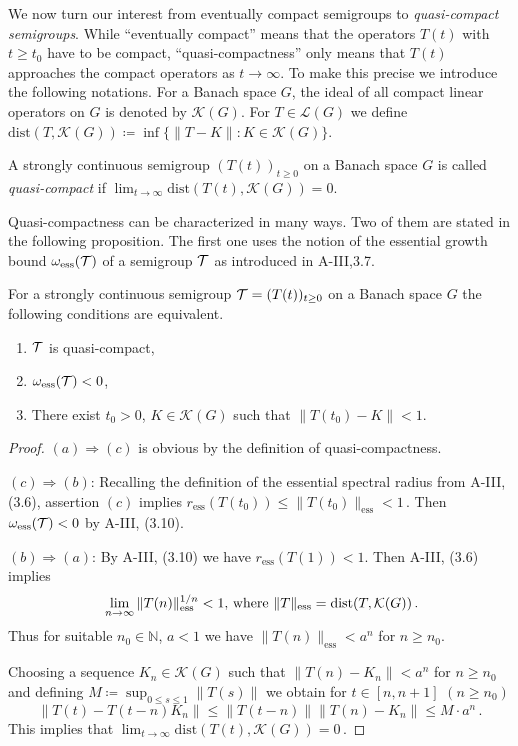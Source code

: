 We now turn our interest from eventually compact semigroups to \emph{quasi-compact semigroups}.
While \enquote{eventually compact} means that the operators $T(t)$ with $t \geq t_{0}$ have to be compact, \enquote{quasi-compactness} only
means that $T(t)$ approaches the compact operators as $t \to \infty$.
To make this precise we introduce the following notations.
For a Banach space $G$, the ideal of all compact linear operators on $G$ is denoted by $\mathcal{K}(G)$.
For $T \in \mathcal{L}(G)$ we define
$\text{dist}(T,\mathcal{K}(G))  \coloneq  \inf\{\|T - K\| \colon K \in \mathcal{K}(G)\}$.

\begin{definition}\label{def:b4-2.7}
	A strongly continuous semigroup $(T(t))_{t \geq 0}$ on a Banach
	space $G$ is called \emph{quasi-compact} if $\lim_{t\to\infty}\text{dist}(T(t),\mathcal{K}(G)) = 0$.
\end{definition}

Quasi-compactness can be characterized in many ways.
Two of them are stated in the following proposition.
The first one uses the notion of the essential growth bound $\omega_{\text{ess}}(\mathcal{T})$ of a semigroup $\mathcal{T}$ as introduced in A-III,3.7.

\begin{proposition}\label{prop:b4-2.8}
	For a strongly continuous semigroup $\mathcal{T} = (T(t))_{t \geq 0}$
	on a Banach space $G$ the following conditions are equivalent.
	\begin{enumerate}[\upshape (a)]
		\item
		$\mathcal{T}$ is quasi-compact,
	
		\item 
		$\omega_{\text{ess}}(\mathcal{T}) < 0$,
	
		\item 
		There exist $t_{0} > 0$, $K \in \mathcal{K}(G)$ such that $\|T(t_{0}) - K\| < 1$.
	\end{enumerate}
\end{proposition}
\begin{proof}
$(a)\Rightarrow(c)$ is obvious by the definition of quasi-compactness.

$(c)\Rightarrow(b)$: Recalling the definition of the essential spectral radius from A-III, (3.6), assertion $(c)$ implies 
$r_{\text{ess}}(T(t_0)) \leq \|T(t_0)\|_{\text{ess}} < 1\,.$ 
Then  $\omega_{\text{ess}}(\mathcal{T}) < 0 $ by A-III, (3.10).

$(b)\Rightarrow(a)$: By A-III, (3.10) we have $r_{\text{ess}}(T(1)) < 1$. Then A-III, (3.6) implies
\[\text{
$\lim_{n \to \infty}\|T(n)\|_{\text{ess}}^{1/n} < 1$,  where $\|T\|_{\text{ess}} = \mathrm{dist}(T,\mathcal{K}(G))$\,.}
\]
Thus for suitable $n_{0} \in \mathbb{N}$, $a < 1$ we have $\|T(n)\|_{\text{ess}} < a^n$ for $n \geq n_{0}$.

Choosing a sequence $K_n \in \mathcal{K}(G)$ such that $\|T(n) - K_n\| < a^n$ for $n \geq n_{0}$ and defining $M \coloneqq \sup_{0 \leq s \leq 1}\|T(s)\|$ we obtain for $t \in [n,n+1]$ $(n \geq n_{0})$ 
\[
\|T(t) - T(t-n)K_n\| \leq \|T(t-n)\|\|T(n) - K_n\| \leq M \cdot a^n\,.
\] 
This implies that $\lim_{t \to \infty}\mathrm{dist}(T(t),\mathcal{K}(G)) = 0\,.$
\end{proof}

